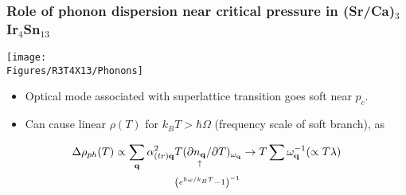 \begin{frame}[label=CIS-phonons]
\frametitle{Role of phonon dispersion near critical pressure in (Sr/Ca)$_3$Ir$_4$Sn$_{13}$}
\centerline{\texttt{[image: \\Figures/R3T4X13/Phonons]}}
\begin{itemize}
\item
Optical mode associated with superlattice transition goes soft near
$p_c$.


\item
Can cause linear $\rho(T)$ for $k_B T>\hbar \Omega$ (frequency scale
of soft branch), as
\end{itemize}
\begin{align*} \Delta\rho_{ph}(T) \propto \sum_{\bf q} \alpha_{(tr) \bf q}^2 &T (\partial  \underset{\uparrow}{n_{\bf q}}/\partial T )_{\omega_{\bf q}} \rightarrow  T \sum
  \omega_{\bf q}^{-1} (\propto T \lambda ) \\
&{\scriptstyle \left(e^{h \!\!\bar{}\,\, \omega /k_B T} - 1\right)^{-1}  }
\end{align*}



\end{frame}





